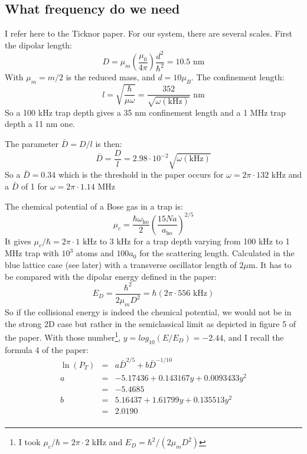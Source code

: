 \documentclass[reprint,amsmath,amssymb,aps,nofootinbib]{revtex4-1}
\begin{document}
\subsection{What frequency do we need}

I refer here to the Ticknor paper. For our system, there are several scales. First the dipolar length:
\begin{equation}
\label{dipolar_length}
D =\mu_{m} \left(\frac{\mu_{0}}{4\pi}\right)\frac{d^{2}}{\hbar^{2}} = 10.5\text{ nm}
\end{equation}
With $\mu_{m} = m/2$ is the reduced mass, and $d = 10\mu_{B}$. The confinement length:
\begin{equation}
l = \sqrt{\frac{\hbar}{\mu\omega}} = \frac{352}{\sqrt{\omega(\text{kHz})}}\text{ nm}
\end{equation}
So a 100 kHz trap depth gives a 35 nm confinement length and a 1 MHz trap depth a 11 nm one.

The parameter $\bar{D} = D/l$ is then:
\begin{equation}
\bar{D} = \frac{D}{l} = 2.98\cdot 10^{-2}\sqrt{\omega(\text{kHz})}
\end{equation}
So a $\bar{D} = 0.34$ which is the threshold in the paper occurs for $\omega = 2\pi\cdot 132\text{ kHz}$ and a $\bar{D}$ of 1 for $\omega = 2\pi\cdot 1.14\text{ MHz}$

The chemical potential of a Bose gas in a trap is:
\begin{equation}
\mu_{c} = \frac{\hbar\omega_{\text{ho}}}{2}\left(\frac{15Na}{a_{\text{ho}}}\right)^{2/5}
\end{equation}
It gives $\mu_{c}/\hbar = 2\pi\cdot 1\text{ kHz}$ to 3 kHz for a trap depth varying from 100 kHz to 1 MHz trap with $10^{3}$ atoms and $100 a_{0}$ for the scattering length. Calculated in the blue lattice case (see later) with a transverse oscillator length of $2\mu$m. It has to be compared with the dipolar energy defined in the paper:
\begin{equation}
E_{D} = \frac{\hbar^{2}}{2\mu_{m}D^{2}} = \hbar (2\pi\cdot 556\text{ kHz})
\end{equation}
So if the collisional energy is indeed the chemical potential, we would not be in the strong 2D case but rather in the semiclassical limit as depicted in figure 5 of the paper. With those number\footnote{I took $\mu_{c}/\hbar = 2\pi\cdot 2$ kHz and $E_{D} = \hbar^{2}/(2\mu_{m}D^{2})$}, $y = log_{10}(E/E_{D})=-2.44$, and I recall the formula 4 of the paper:
\begin{equation}
\begin{array}{cllll}
\ln(P_{T}) &=& a\bar{D}^{2/5} + b\bar{D}^{-1/10} \\
a &=& -5.17436 + 0.143167 y + 0.0093433 y^{2} \\
  &= & -5.4685 \\
b &=& 5.16437 + 1.61799 y + 0.135513 y^{2}\\
  &=& 2.0190 \\
\end{array}
\end{equation}
\end{document}
